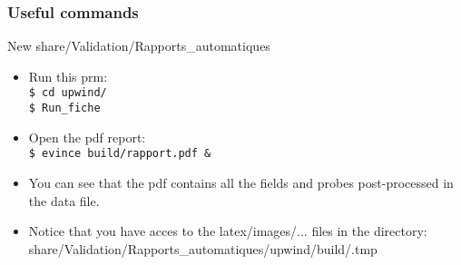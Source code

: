 \documentclass[10pt, hyperref={unicode=true,pdfusetitle, bookmarks=true,bookmarksnumbered=false,bookmarksopen=false, breaklinks=false,pdfborder={0 0 1},backref=true,colorlinks=true,linkcolor=darkblue,pageanchor, urlcolor=darkblue}]{beamer}
\begin{document}
\begin{frame}
\frametitle{Useful commands}
\begin{block}{New share/Validation/Rapports\_automatiques}
\begin{itemize}
\item Run this prm:\\
\texttt{\$ cd upwind/}\\
\texttt{\$ Run\_fiche}\\
\item Open the pdf report:\\
\texttt{\$ evince build/rapport.pdf \&}\\
\item You can see that the pdf contains all the fields and probes post-processed in the data file.
\item Notice that you have acces to the latex/images/... files in the directory:\\
share/Validation/Rapports\_automatiques/upwind/build/.tmp
\end{itemize}
\end{block}
\end{frame}
\end{document}
